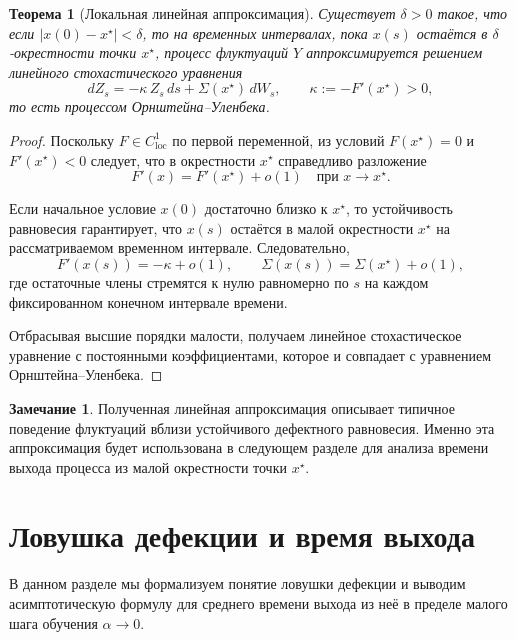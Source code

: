 \documentclass[12pt,a4paper]{article}
\newtheorem{theorem}{Теорема}
\theoremstyle{definition}
\newtheorem{remark}{Замечание}
\begin{document}
\begin{theorem}[Локальная линейная аппроксимация]
\label{thm:ou_correct}
Существует $\delta>0$ такое, что
если $|x(0)-x^\star|<\delta$,
то на временных интервалах,
пока $x(s)$ остаётся в $\delta$-окрестности точки $x^\star$,
процесс флуктуаций $Y$
аппроксимируется решением линейного стохастического уравнения
\[
dZ_s
=
-\kappa\,Z_s\,ds
+
\Sigma(x^\star)\,dW_s,
\qquad
\kappa := -F'(x^\star)>0,
\]
то есть процессом Орнштейна--Уленбека.
\end{theorem}

\begin{proof}
Поскольку $F\in C^1_{\mathrm{loc}}$ по первой переменной,
из условий $F(x^\star)=0$ и $F'(x^\star)<0$ следует,
что в окрестности $x^\star$ справедливо разложение
\[
F'(x)
=
F'(x^\star)
+
o(1)
\quad
\text{при } x\to x^\star.
\]

Если начальное условие $x(0)$ достаточно близко к $x^\star$,
то устойчивость равновесия гарантирует,
что $x(s)$ остаётся в малой окрестности $x^\star$
на рассматриваемом временном интервале.
Следовательно,
\[
F'(x(s)) = -\kappa + o(1),
\qquad
\Sigma(x(s)) = \Sigma(x^\star) + o(1),
\]
где остаточные члены стремятся к нулю равномерно по $s$
на каждом фиксированном конечном интервале времени.

Отбрасывая высшие порядки малости,
получаем линейное стохастическое уравнение
с постоянными коэффициентами,
которое и совпадает с уравнением Орнштейна--Уленбека.
\end{proof}

\begin{remark}
Полученная линейная аппроксимация описывает
типичное поведение флуктуаций
вблизи устойчивого дефектного равновесия.
Именно эта аппроксимация будет использована
в следующем разделе
для анализа времени выхода процесса
из малой окрестности точки $x^\star$.
\end{remark}


\section{Ловушка дефекции и время выхода}

В данном разделе мы формализуем понятие ловушки дефекции
и выводим асимптотическую формулу
для среднего времени выхода из неё
в пределе малого шага обучения $\alpha \to 0$.

\end{document}
